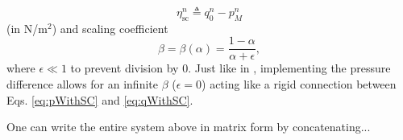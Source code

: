 \begin{equation}
    \eta_\text{sc}^n \triangleq q_0^n - p_M^n
\end{equation}
(in N/m$^2$) and scaling coefficient
\begin{equation}\label{eq:betaDef}
    \beta = \beta(\alpha) = \frac{1-\alpha}{\alpha+\epsilon},
\end{equation}
where $\epsilon\ll 1$ to prevent division by 0. Just like in \cite{Willemsen2021}, implementing the pressure difference allows for an infinite $\beta$ ($\epsilon = 0$) acting like a rigid connection between Eqs. \eqref{eq:pWithSC} and \eqref{eq:qWithSC}.


One can write the entire system above in matrix form by concatenating...

